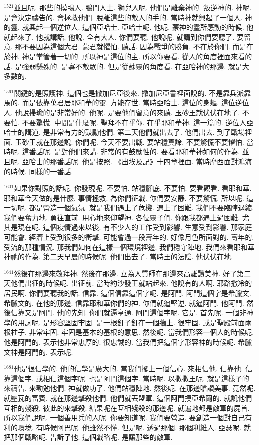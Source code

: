 \documentclass{book}
\begin{document}
$^{1521}$並且呢.
那些的摸鴨人.
鴨門人士.
獅兒人呢.
他們是離棄神的.
叛逆神的.
神呢.
是會決定禱告的.
會拯救他們.
脫離這些的敵人的手的.
當時神就興起了一個人.
神的靈.
就興起一個逆位人.
這個亞哈士.
亞哈士呢.
他呢.
蒙神的靈所感動的時候.
他就起來了.
他就講話.
他說.
全有大人.
你們要聽.
他說呢.
就講到你們要聽了.
要留意.
那不要因為這個大君.
蒙君就懼怕.
聽話.
因為戰爭的勝負.
不在於你們.
而是在於神.
神是掌管著一切的.
所以神是這位的主.
所以你要看.
從人的角度裡面來看的話.
是強弱懸殊的.
是寡不敵眾的.
但是從蘇靈的角度看.
在亞哈神的那邊.
就是大多數的.

$^{1561}$關鍵的是照護神.
這個也是撒加尼亞後來.
撒加尼亞書裡面說的.
不是靠兵派靠馬的.
而是依靠萬君居耶和華的靈.
方能存世.
當時亞哈士.
這位的身軀.
這位逆位人.
他說掃瑜的是非常好的.
他呢.
是要他們留意的來聽.
玉砂王就伏伏在地了.
不要怕.
不要驚慌.
中間是什麼呢.
聖拜不在乎你.
在乎耶和華神.
這一篇的.
逆位人亞哈士的講道.
是非常有力的鼓勵他們.
第二天他們就出去了.
他們出去.
到了戰場裡面.
玉砂王就在那邊說.
你們呢.
今天不要出戰.
要站穩真諦.
不要驚慌不要懼怕.
當時呢.
這番話呢.
是對他們來講.
非常的有鼓勵性的.
要看耶和華神如何的作為.
並且呢.
亞哈士的那番話呢.
他是按照.
《出埃及記》十四章裡面.
當時摩西面對鴻海的時候.
同樣的一番話.

$^{1601}$如果你對照的話呢.
你發現呢.
不要怕.
站穩腳底.
不要怕.
要看觀看.
看耶和華.
耶和華今天做的是什麼.
事情拯救.
為你們征戰.
你們要安靜.
不要驚慌.
所以呢.
這一切呢.
都是營造一個氣氛.
就是我們遇上了危機.
遇上了困難.
我們不要臨陣退縮.
我們要奮力地.
勇往直前.
用心地來仰望神.
各位靈子們.
你跟我都遇上過困難.
尤其是現在呢.
這個疫情過來以後.
有不少人的工作受到影響.
生意受到影響.
那家庭可能會.
經濟上受到很多的衝擊.
可能會過一段壽年的.
好像月色所面對的.
壽年的.
受流的那種情況.
那我們如何在這樣一個環境裡邊.
我們穩守陣地.
我們來看耶和華神祂的作為.
第二天早晨的時候呢.
他們出去了.
當時王的法陰.
他伏伏在地.

$^{1641}$然後在那邊來敬拜神.
然後在那邊.
立為人質師在那邊來高雄讚美神.
好了第二天他們出征的時候呢.
出征前.
當時約沙發王就站起來.
他說有的人啊.
耶路撒冷的居民啊.
你們要聽我的話.
信靠.
這個信靠這個字呢.
是阿門.
阿門這個字是希臘文.
希臘文的.
在他的那邊.
信靠耶和華你們的神.
你們就逼堅逆.
就逼阿門.
他阿門.
然後信靠又是阿門.
他的先知.
你們就逼亨通.
阿門這個字呢.
它是.
首先呢.
一個非神學的用詞呢.
是形容堅固牢固.
是一根釘子釘在一個牆上.
很牢固.
或是聖殿前面兩根柱子.
非常牢固.
牢固是基本的基根的意思.
然後呢.
當我們形容一個人的時候呢.
他是阿門的.
表示他非常忠厚的.
很忠誠的.
當我們把這個字形容神的時候呢.
希臘文神是阿門的.
表示呢.

$^{1681}$他是很信學的.
他的信學是廣大的.
當我們擺上一個信心.
來相信他.
信靠他.
信靠這個字.
或相信這個字呢.
也是阿門這個字.
當時呢.
以撒撒王呢.
就是這樣子的來禱告.
來勸勉他們.
神就做功了.
他們站穩陣地.
然後呢.
在那邊嗆讚美事.
竟然呢.
就壓瓦的富賓.
就在那邊擊殺他們.
他們就丟盟軍.
這個阿門摸亞希爾的.
就說他們互相的殘殺.
彼此的來擊殺.
結果呢在互相殘殺的那邊呢.
就遍地都是敵軍的屍首.
所以我們說呢.
一個善用兵的人呢.
你要知道呢.
我們要營造.
要創造一個對自己有利的環境.
有時候阿巴呢.
他雖然不懂.
但是呢.
透過那個.
那個利維人.
亞瑟呢.
就把那個戰略呢.
告訴了他.
這個戰略呢.
是讓那些的敵軍.
\end{document}
